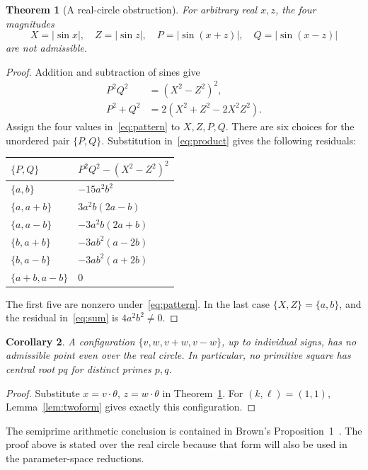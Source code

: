 \documentclass[11pt,letterpaper]{article}
\newtheorem{theorem}{Theorem}[section]
\newtheorem{corollary}[theorem]{Corollary}
\theoremstyle{definition}\newtheorem{definition}[theorem]{Definition}
\theoremstyle{remark}\newtheorem{remark}[theorem]{Remark}
\begin{document}
\begin{theorem}[A real-circle obstruction]\label{thm:real}
For arbitrary real $x,z$, the four magnitudes
\[
 X=|\sin x|,\quad Z=|\sin z|,\quad
 P=|\sin(x+z)|,\quad Q=|\sin(x-z)|
\]
are not admissible.
\end{theorem}
\begin{proof}
Addition and subtraction of sines give
\begin{align}
 P^2Q^2&=(X^2-Z^2)^2,\label{eq:product}\\
 P^2+Q^2&=2(X^2+Z^2-2X^2Z^2).\label{eq:sum}
\end{align}
Assign the four values in~\eqref{eq:pattern} to $X,Z,P,Q$. There are six choices for the unordered pair $\{P,Q\}$. Substitution in~\eqref{eq:product} gives the following residuals:
\begin{center}
\begin{tabular}{ll}
\toprule
$\{P,Q\}$ & $P^2Q^2-(X^2-Z^2)^2$\\
\midrule
$\{a,b\}$ & $-15a^2b^2$\\
$\{a,a+b\}$ & $3a^2b(2a-b)$\\
$\{a,a-b\}$ & $-3a^2b(2a+b)$\\
$\{b,a+b\}$ & $-3ab^2(a-2b)$\\
$\{b,a-b\}$ & $-3ab^2(a+2b)$\\
$\{a+b,a-b\}$ & $0$\\
\bottomrule
\end{tabular}
\end{center}
The first five are nonzero under~\eqref{eq:pattern}. In the last case $\{X,Z\}=\{a,b\}$, and the residual in~\eqref{eq:sum} is $4a^2b^2\ne0$.
\end{proof}

\begin{corollary}\label{cor:parallelogram}
A configuration $\{v,w,v+w,v-w\}$, up to individual signs, has no admissible point even over the real circle. In particular, no primitive square has central root $pq$ for distinct primes $p,q$.
\end{corollary}
\begin{proof}
Substitute $x=v\cdot\theta$, $z=w\cdot\theta$ in Theorem~\ref{thm:real}. For $(k,\ell)=(1,1)$, Lemma~\ref{lem:twoform} gives exactly this configuration.
\end{proof}
The semiprime arithmetic conclusion is contained in Brown's Proposition~1~\cite{Brown417}. The proof above is stated over the real circle because that form will also be used in the parameter-space reductions.
\end{document}
